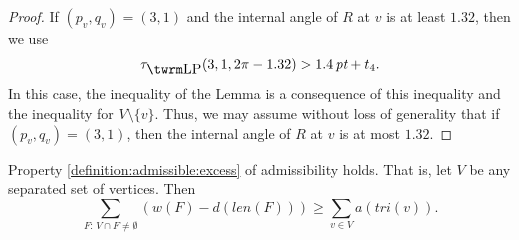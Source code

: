 \begin{proof} If $(p_v,q_v)=(3,1)$ and the internal angle of $R$ at $v$ is at
least $1.32$, then we use
   $$\tauLP(3,1,2\pi-1.32) > 1.4\,\pt + t_4.$$
In this case, the inequality of the Lemma is a consequence of this
inequality and the inequality for $V\setminus\{v\}$.  Thus, we may
assume without loss of generality that if $(p_v,q_v)=(3,1)$, then
the internal angle of $R$ at $v$ is at most $1.32$.
\end{proof}

\begin{lemma}  Property \ref{definition:admissible:excess}  of
admissibility holds.  That is, let $V$ be any separated set of
vertices. Then
        $$\sum_{F:\,V\cap F\ne\emptyset} (w(F) -d(len(F)))
            \ge \sum_{v\in V} a(tri(v)).$$
\end{lemma}

